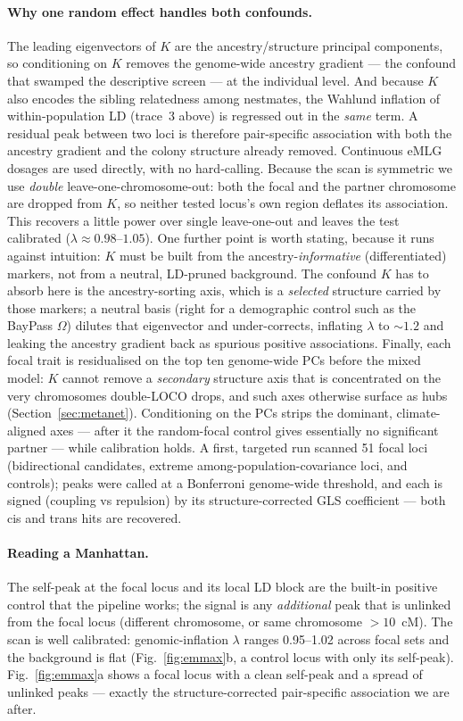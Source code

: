 \documentclass[11pt]{article}
\begin{document}
\paragraph{Why one random effect handles both confounds.} The leading eigenvectors of
$K$ are the ancestry/structure principal components, so conditioning on $K$ removes
the genome-wide ancestry gradient --- the confound that swamped the descriptive
screen --- at the individual level. And because $K$ also encodes the sibling
relatedness among nestmates, the Wahlund inflation of within-population LD (trace~3
above) is regressed out in the \emph{same} term. A residual peak between two loci is
therefore pair-specific association with both the ancestry gradient and the colony
structure already removed. Continuous eMLG dosages are used directly, with no
hard-calling. Because the scan is symmetric we use \emph{double}
leave-one-chromosome-out: both the focal and the partner chromosome are dropped from
$K$, so neither tested locus's own region deflates its association. This recovers a
little power over single leave-one-out and leaves the test calibrated
($\lambda\approx 0.98$--$1.05$). One further point is worth stating, because it runs
against intuition: $K$ must be built from the ancestry-\emph{informative}
(differentiated) markers, not from a neutral, LD-pruned background. The confound $K$
has to absorb here is the ancestry-sorting axis, which is a \emph{selected} structure
carried by those markers; a neutral basis (right for a demographic control such as the
BayPass $\Omega$) dilutes that eigenvector and under-corrects, inflating $\lambda$ to
$\sim\!1.2$ and leaking the ancestry gradient back as spurious positive associations.
Finally, each focal trait is residualised on the top ten genome-wide PCs before the
mixed model: $K$ cannot remove a \emph{secondary} structure axis that is concentrated
on the very chromosomes double-LOCO drops, and such axes otherwise surface as hubs
(Section~\ref{sec:metanet}). Conditioning on the PCs strips the dominant, climate-aligned
axes --- after it the random-focal control gives essentially no significant partner ---
while calibration holds. A first, targeted run scanned 51 focal loci (bidirectional
candidates, extreme among-population-covariance loci, and controls); peaks were called at
a Bonferroni genome-wide threshold, and each is signed (coupling vs repulsion) by its
structure-corrected GLS coefficient --- both cis and trans hits are recovered.

\paragraph{Reading a Manhattan.} The self-peak at the focal locus and its local LD
block are the built-in positive control that the pipeline works; the signal is any
\emph{additional} peak that is unlinked from the focal locus (different chromosome,
or same chromosome $>10$~cM). The scan is well calibrated: genomic-inflation
$\lambda$ ranges 0.95--1.02 across focal sets and the background is flat
(Fig.~\ref{fig:emmax}b, a control locus with only its self-peak). Fig.~\ref{fig:emmax}a
shows a focal locus with a clean self-peak and a spread of unlinked peaks --- exactly
the structure-corrected pair-specific association we are after.
\end{document}
